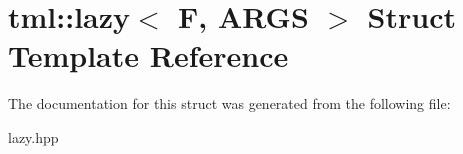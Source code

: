 \hypertarget{structtml_1_1lazy}{\section{tml\+:\+:lazy$<$ F, A\+R\+G\+S $>$ Struct Template Reference}
\label{structtml_1_1lazy}
}


The documentation for this struct was generated from the following file\+:\begin{DoxyCompactItemize}
\item 
lazy.\+hpp\end{DoxyCompactItemize}
